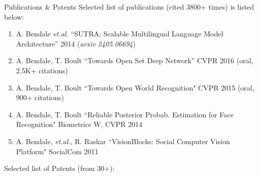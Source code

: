 \documentclass[
	10pt, %
]{resume} %
\begin{document}
\begin{rSection}{Publications \& Patents}
Selected list of publications (cited 3800+ times)  is listed below: 
	\begin{enumerate}
	 \item A. Bendale \textit{et.al.} ``SUTRA: Scalable Multilingual Language Model Architecture'' 2014 (\textit{arxiv 2405.06694})
	  \item A. Bendale, T. Boult ``Towards Open Set Deep Network'' CVPR 2016 (oral, 2.5K+ citations)	
	  \item A. Bendale, T. Boult ``Towards Open World Recognition" CVPR 2015 (oral, 900+ citations)
   	 \item A. Bendale, T. Boult ``Reliable Posterior Probab. Estimation for Face Recognition" Biometrics W, CVPR 2014 
   	 \item A. Bendale, \textit{et.al.}, R. Raskar ``VisionBlocks: Social Computer Vision Platform" SocialCom 2011
	\end{enumerate}
	
Selected list of Patents (from 30+):  %


\end{rSection}
\end{document}
